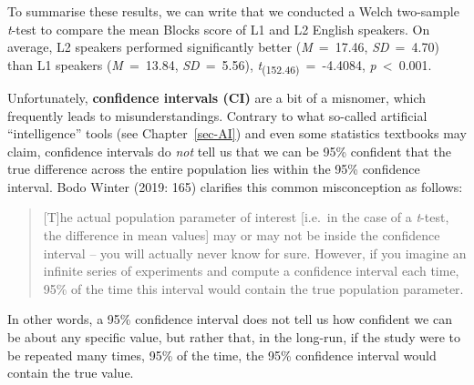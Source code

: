 \documentclass[
  letterpaper,
  DIV=11,
  numbers=noendperiod]{scrreprt}
\begin{document}
\begin{tcolorbox}[enhanced jigsaw, arc=.35mm, bottomrule=.15mm, bottomtitle=1mm, breakable, colback=white, colbacktitle=quarto-callout-note-color!10!white, colframe=quarto-callout-note-color-frame, coltitle=black, left=2mm, leftrule=.75mm, opacityback=0, opacitybacktitle=0.6, rightrule=.15mm, title=\textcolor{quarto-callout-note-color}{\faInfo}\hspace{0.5em}{How to report \emph{t}-tests}, titlerule=0mm, toprule=.15mm, toptitle=1mm]

To summarise these results, we can write that we conducted a Welch
two-sample \emph{t}-test to compare the mean Blocks score of L1 and L2
English speakers. On average, L2 speakers performed significantly better
(\emph{M}~=~17.46, \emph{SD}~=~4.70) than L1 speakers (\emph{M}~=~13.84,
\emph{SD}~=~5.56), \emph{t}\textsubscript{(152.46)}~=~-4.4084,
\emph{p}~\textless~0.001.

\end{tcolorbox}

\begin{tcolorbox}[enhanced jigsaw, arc=.35mm, bottomrule=.15mm, bottomtitle=1mm, breakable, colback=white, colbacktitle=quarto-callout-warning-color!10!white, colframe=quarto-callout-warning-color-frame, coltitle=black, left=2mm, leftrule=.75mm, opacityback=0, opacitybacktitle=0.6, rightrule=.15mm, title=\textcolor{quarto-callout-warning-color}{\faExclamationTriangle}\hspace{0.5em}{Common misconception}, titlerule=0mm, toprule=.15mm, toptitle=1mm]

Unfortunately, \textbf{confidence intervals (CI)} are a bit of a
misnomer, which frequently leads to misunderstandings. Contrary to what
so-called artificial ``intelligence'' tools (see Chapter~\ref{sec-AI})
and even some statistics textbooks may claim, confidence intervals do
\emph{not} tell us that we can be 95\% confident that the true
difference across the entire population lies within the 95\% confidence
interval. Bodo Winter (2019: 165) clarifies this common misconception as
follows:

\begin{quote}
{[}T{]}he actual population parameter of interest {[}i.e.~in the case of
a \emph{t}-test, the difference in mean values{]} may or may not be
inside the confidence interval -- you will actually never know for sure.
However, if you imagine an infinite series of experiments and compute a
confidence interval each time, 95\% of the time this interval would
contain the true population parameter.
\end{quote}

In other words, a 95\% confidence interval does not tell us how
confident we can be about any specific value, but rather that, in the
long-run, if the study were to be repeated many times, 95\% of the time,
the 95\% confidence interval would contain the true value.

\end{tcolorbox}
\end{document}
